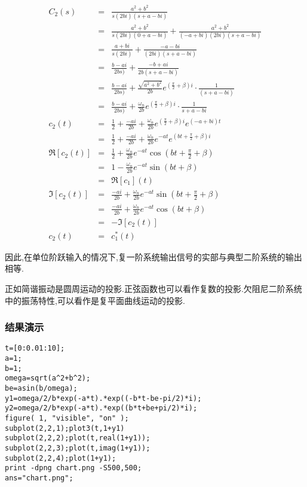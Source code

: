 \documentclass{article}
\begin{document}
\begin{frame}
\begin{eqnarray*}
C_2(s) &=& \frac{a^2+b^2}{s(2bi)(s+a-bi)}\\
     &=& \frac{a^2+b^2}{s(2bi)(0+a-bi)}+\frac{a^2+b^2}{(-a+bi)(2bi)(s+a-bi)}\\
     &=& \frac{a+bi}{s(2bi)}+\frac{-a-bi}{(2bi)(s+a-bi)}\\
     &=& \frac{b-ai}{2bs)}+\frac{-b+ai}{2b(s+a-bi)}\\
     &=& \frac{b-ai}{2bs)}+\frac{\sqrt{a^2+b^2}}{2b}e^{(\frac{\pi}{2}+\beta)i}\cdot\frac{1}{(s+a-bi)}\\
     &=& \frac{b-ai}{2bs)}+\frac{\omega_n}{2b}e^{(\frac{\pi}{2}+\beta)i}\cdot\frac{1}{s+a-bi}\\
c_2(t) &=& \frac{1}{2}+\frac{-ai}{2b}+\frac{\omega_n}{2b}e^{(\frac{\pi}{2}+\beta)i}e^{(-a+bi)t}\\
     &=& \frac{1}{2}+\frac{-ai}{2b}+\frac{\omega_n}{2b}e^{-at}e^{(bt+\frac{\pi}{2}+\beta)i}\\
\Re[c_2(t)] &=& \frac{1}{2}+\frac{\omega_n}{2b}e^{-at}\cos(bt+\frac{\pi}{2}+\beta)\\
     &=& 1-\frac{\omega_n}{2b}e^{-at} \sin(bt+\beta)\\
     &=& \Re[c_1](t) \\
\Im[c_2(t)] &=& \frac{-ai}{2b}+\frac{\omega_n}{2b}e^{-at}\sin(bt+\frac{\pi}{2}+\beta)\\
            &=& \frac{-ai}{2b}+\frac{\omega_n}{2b}e^{-at}\cos(bt+\beta)\\
            &=& -\Im[c_2(t)] \\
c_2(t) &=& c_1^*(t)
\end{eqnarray*}

因此,在单位阶跃输入的情况下,复一阶系统输出信号的实部与典型二阶系统的输出相等.

正如简谐振动是圆周运动的投影.正弦函数也可以看作复数的投影.欠阻尼二阶系统中的振荡特性,可以看作是复平面曲线运动的投影.
\end{frame}
\begin{frame}[fragile]
\frametitle{结果演示}
\label{sec-2-1-5}


\begin{verbatim}
t=[0:0.01:10];
a=1;
b=1;
omega=sqrt(a^2+b^2);
be=asin(b/omega);
y1=omega/2/b*exp(-a*t).*exp((-b*t-be-pi/2)*i);
y2=omega/2/b*exp(-a*t).*exp((b*t+be+pi/2)*i);
figure( 1, "visible", "on" );
subplot(2,2,1);plot3(t,1+y1)
subplot(2,2,2);plot(t,real(1+y1));
subplot(2,2,3);plot(t,imag(1+y1));
subplot(2,2,4);plot(1+y1);
print -dpng chart.png -S500,500;
ans="chart.png";
\end{verbatim}
\end{frame}
\end{document}
